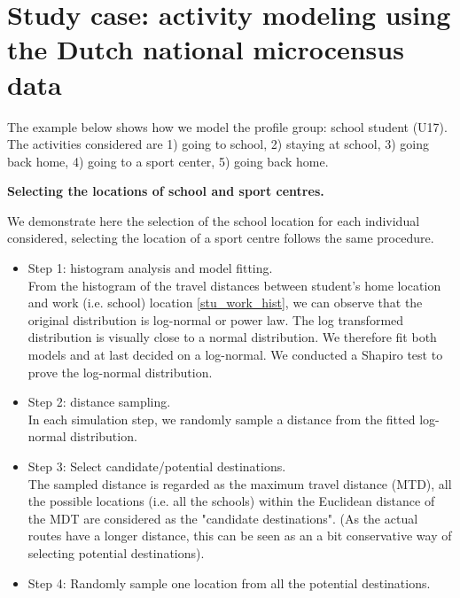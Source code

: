 \documentclass[]{article}
\begin{document}
\section{Study case: activity modeling using the Dutch national microcensus data}
\label{sec:case}
The example below shows how we model the profile group: school student (U17). The activities considered are 1) going to school, 2) staying at school, 3) going back home, 4) going to a sport center, 5) going back home.  


\textbf{Selecting the locations of school and sport centres.}

We demonstrate here the selection of the school location for each individual considered, selecting the location of a sport centre follows the same procedure.   
\begin{itemize}
    \item Step 1: histogram analysis and model fitting. \\ From the histogram of the travel distances between student's home location and work (i.e. school) location \cref{stu_work_hist}, we can observe that the original distribution is log-normal or power law. The log transformed distribution is visually close to a normal distribution. We therefore fit both models and at last decided on a log-normal. We conducted a Shapiro test to prove the log-normal distribution.  
    
    \item Step 2: distance sampling. \\ In each simulation step, we randomly sample a distance from the fitted log-normal distribution.
    
    \item Step 3: Select candidate/potential destinations. \\ The sampled distance is regarded as the maximum travel distance (MTD), all the possible locations (i.e. all the schools) within the Euclidean distance of the MDT are considered as the "candidate destinations". (As the actual routes have a longer distance, this can be seen as an a bit conservative way of selecting potential destinations). 
    
    \item Step 4: Randomly sample one location from all the potential destinations.
    
\end{itemize}
\end{document}
